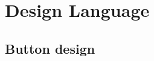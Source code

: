 \section{Design Language}
\label{design:design_language}

\subsection{Button design}
\label{design:button_design}